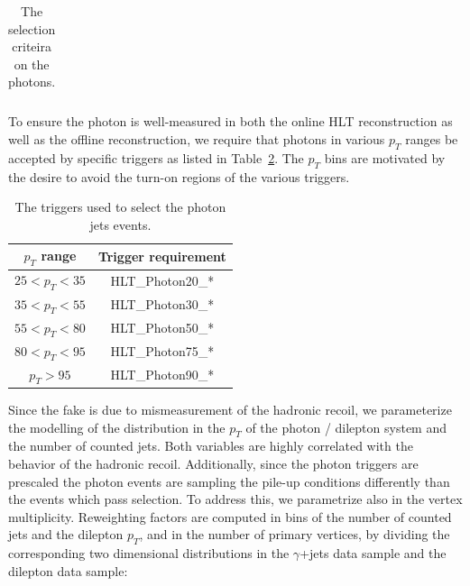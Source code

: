 \begin{table}[!ht]
\begin{center}
\begin{tabular}{|c|c|}
\end{tabular}
\caption{The selection criteira on the photons.
\label{tab:PhotonSelection}}
\end{center}
\end{table}

To ensure the photon is well-measured in both the online HLT reconstruction as well as the offline reconstruction, we require that photons in
various $p_T$ ranges be accepted by specific triggers as listed in Table~\ref{tab:PhotonTriggerPtBins}. The $p_T$ bins are motivated by the
desire to avoid the turn-on regions of the various triggers.
\begin{table}[!ht]
\begin{center}
\begin{tabular}{|c|c|} 
\hline
$p_T$ range     & Trigger requirement \\
\hline
$25 < p_T < 35$ & HLT\_Photon20\_* \\
$35 < p_T < 55$ & HLT\_Photon30\_* \\
$55 < p_T < 80$ & HLT\_Photon50\_* \\
$80 < p_T < 95$ & HLT\_Photon75\_* \\
$p_T > 95$      & HLT\_Photon90\_* \\
\hline
\end{tabular}
\caption{The triggers used to select the photon jets events.
\label{tab:PhotonTriggerPtBins}}
\end{center}
\end{table}

Since the fake \met is due to mismeasurement of the hadronic recoil, we parameterize the 
modelling of the \met distribution in the $p_{T}$ of the photon / dilepton system and 
the number of counted jets. Both variables are highly correlated with the behavior 
of the hadronic recoil. Additionally, since the photon triggers are prescaled
the photon events are sampling the pile-up conditions differently than the events which
pass selection. To address this, we parametrize also in the vertex multiplicity.
Reweighting factors are computed in bins of the number of counted jets
and the dilepton $p_{T}$, and in the number of primary vertices,
by dividing the corresponding two dimensional distributions
in the $\gamma$+jets data sample and the dilepton data sample:

